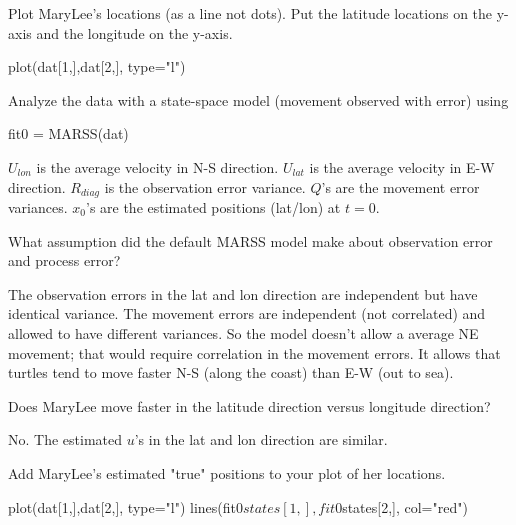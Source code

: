 \begin{wideenumerate}
\item Plot MaryLee's locations (as a line not dots).  Put the latitude locations on the y-axis and the longitude on the y-axis. 

\begin{Schunk}
\begin{Sinput}
 plot(dat[1,],dat[2,], type="l")
\end{Sinput}
\end{Schunk}

\item Analyze the data with a state-space model (movement observed with error) using

\begin{Schunk}
\begin{Sinput}
 fit0 = MARSS(dat)
\end{Sinput}
\end{Schunk}

$U_{lon}$ is the average velocity in N-S direction. $U_{lat}$ is the average velocity in E-W direction. $R_{diag}$ is the observation error variance. $Q$'s are the movement error variances. $x_0$'s are the estimated positions (lat/lon) at $t=0$.

\item What assumption did the default MARSS model make about observation error and process error?

The observation errors in the lat and lon direction are independent but have identical variance.  The movement errors are independent (not correlated) and allowed to have different variances.  So the model doesn't allow a average NE movement; that would require correlation in the movement errors.  It allows that turtles tend to move faster N-S (along the coast) than E-W (out to sea).

\item Does MaryLee move faster in the latitude direction versus longitude direction?

No. The estimated $u$'s in the lat and lon direction are similar.

\item Add MaryLee's estimated "true" positions to your plot of her locations. 

\begin{Schunk}
\begin{Sinput}
 plot(dat[1,],dat[2,], type="l")
 lines(fit0$states[1,], fit0$states[2,], col="red")
\end{Sinput}
\end{Schunk}


\end{wideenumerate}
